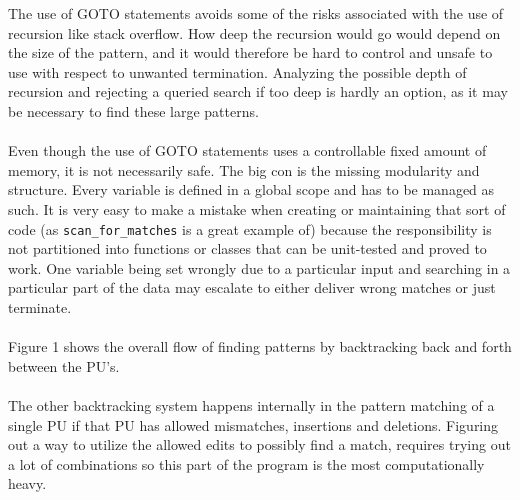 \documentclass[12pt]{article}
\newcommand{\scm}{\texttt{scan\_for\_matches} }
\newcommand{\pu}{PU }
\begin{document}
\noindent The use of GOTO statements avoids some of the risks associated with the use of recursion like stack overflow. 
How deep the recursion would go would depend on the size of the pattern, and it would therefore be hard to control and
unsafe to use with respect to unwanted termination. Analyzing the possible depth of recursion and rejecting a queried search
if too deep is hardly an option, as it may be necessary to find these large patterns. \\ \\
Even though the use of GOTO statements uses a controllable fixed amount of
memory, it is not necessarily safe. The big con is the missing modularity and structure. Every variable is defined in a
global scope and has to be managed as such. It is very easy to make a mistake when creating or maintaining that sort of code
(as \scm is a great example of)
because the responsibility is not partitioned into functions or classes that can be unit-tested and proved to work.
One variable being set wrongly due to a particular input and searching in a particular part of the data may 
escalate to either deliver wrong matches or just terminate. \\ \\
Figure 1 shows the overall flow of finding patterns by backtracking back and forth between the PU's. \\ \\
The other backtracking system happens internally in the pattern matching of a single \pu if that \pu has allowed
mismatches, insertions and deletions. Figuring out a way to utilize the allowed edits to possibly find a match, requires
trying out a lot of combinations so this part of the program is the most computationally heavy. 
\end{document}

